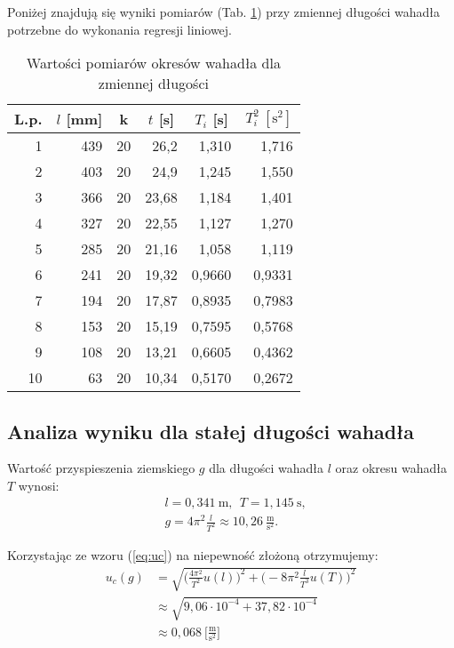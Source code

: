 \documentclass[12pt,a4paper]{article}
\numberwithin{equation}{section}
\begin{document}
Poniżej znajdują się wyniki pomiarów (Tab. \ref{tab:tab2}) przy zmiennej długości wahadła potrzebne do wykonania regresji liniowej.
\begin{table}[!ht]
	\caption{Wartości pomiarów okresów wahadła dla zmiennej długości}
	\begin{center}
		\begin{tabular}{r|r|r|r|r|r}
			\hline
			\multicolumn{1}{c|}{L.p.} & \multicolumn{1}{c|}{$l$ [mm]} & \multicolumn{1}{c|}{k} & \multicolumn{1}{c|}{$t$ [s]} & \multicolumn{1}{c|}{$T_i$ [s]} & \multicolumn{1}{c}{$T_{i}^{2} ~[\textrm{s}^2]$} \\ \hline \hline
			1 & 439 & 20 & 26,2 & 1,310 & 1,716 \\
			2 & 403 & 20 & 24,9 & 1,245 & 1,550 \\
			3 & 366 & 20 & 23,68 & 1,184 & 1,401 \\
			4 & 327 & 20 & 22,55 & 1,127 & 1,270 \\
			5 & 285 & 20 & 21,16 & 1,058 & 1,119\\
			6 & 241 & 20 & 19,32 & 0,9660 & 0,9331 \\
			7 & 194 & 20 & 17,87 & 0,8935 & 0,7983 \\
			8 & 153 & 20 & 15,19 & 0,7595 & 0,5768 \\
			9 & 108 & 20 & 13,21 & 0,6605 & 0,4362 \\
			10 & 63 & 20 & 10,34 & 0,5170 & 0,2672 \\ \hline
		\end{tabular}
	\end{center}
	\label{tab:tab2}
\end{table}

\pagebreak
\subsection{Analiza wyniku dla stałej długości wahadła}
Wartość przyspieszenia ziemskiego $g$ dla długości wahadła $l$ oraz okresu wahadła $T$ wynosi:
\begin{equation}
	\begin{split}
		&l = 0,341~\textrm{m},~~T = 1,145~\textrm{s}, \\ 
		&g = 4\pi^2\frac{l}{T^2} \approx 10,26~\frac{\textrm{m}}{\textrm{s}^2}.
	\end{split}
\end{equation}

Korzystając ze wzoru (\ref{eq:uc}) na niepewność złożoną otrzymujemy:
\begin{equation}
	\begin{split}
	u_c(g) & = \sqrt{\Bigg(\frac{4\pi^2}{T^2}u(l)\Bigg)^2 + \Bigg(-8\pi^2\frac{l}{T^3}u(T)\Bigg)^2} \\
	 	   & \approx \sqrt{9,06 \cdot 10^{-4} + 37,82 \cdot 10^{-4}} \\ & \approx0,068~\Big[\frac{\textrm{m}}{\textrm{s}^2}\Big]
	\end{split}
\end{equation}
\end{document}
